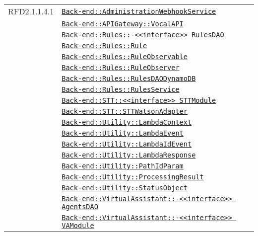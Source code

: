 \begin{longtable}{|>{\centering}m{3cm}|m{10cm}<{\centering}|}
RFD2.1.1.4.1 & \hyperref[Back-end::AdministrationWebhookService]{\texttt{Back-end::AdministrationWebhookService}}\\
& \hyperref[Back-end::APIGateway::VocalAPI]{\texttt{Back-end::APIGateway::VocalAPI}}\\
& \hyperref[Back-end::Rules::<<interface>> RulesDAO]{\texttt{Back-end::Rules::-\linebreak <<interface>> RulesDAO}}\\
& \hyperref[Back-end::Rules::Rule]{\texttt{Back-end::Rules::Rule}}\\
& \hyperref[Back-end::Rules::RuleObservable]{\texttt{Back-end::Rules::RuleObservable}}\\
& \hyperref[Back-end::Rules::RuleObserver]{\texttt{Back-end::Rules::RuleObserver}}\\
& \hyperref[Back-end::Rules::RulesDAODynamoDB]{\texttt{Back-end::Rules::RulesDAODynamoDB}}\\
& \hyperref[Back-end::Rules::RulesService]{\texttt{Back-end::Rules::RulesService}}\\
& \hyperref[Back-end::STT::<<interface>> STTModule]{\texttt{Back-end::STT::<<interface>> STTModule}}\\
& \hyperref[Back-end::STT::STTWatsonAdapter]{\texttt{Back-end::STT::STTWatsonAdapter}}\\
& \hyperref[Back-end::Utility::LambdaContext]{\texttt{Back-end::Utility::LambdaContext}}\\
& \hyperref[Back-end::Utility::LambdaEvent]{\texttt{Back-end::Utility::LambdaEvent}}\\
& \hyperref[Back-end::Utility::LambdaIdEvent]{\texttt{Back-end::Utility::LambdaIdEvent}}\\
& \hyperref[Back-end::Utility::LambdaResponse]{\texttt{Back-end::Utility::LambdaResponse}}\\
& \hyperref[Back-end::Utility::PathIdParam]{\texttt{Back-end::Utility::PathIdParam}}\\
& \hyperref[Back-end::Utility::ProcessingResult]{\texttt{Back-end::Utility::ProcessingResult}}\\
& \hyperref[Back-end::Utility::StatusObject]{\texttt{Back-end::Utility::StatusObject}}\\
& \hyperref[Back-end::VirtualAssistant::<<interface>> AgentsDAO]{\texttt{Back-end::VirtualAssistant::-\linebreak <<interface>> AgentsDAO}}\\
& \hyperref[Back-end::VirtualAssistant::<<interface>> VAModule]{\texttt{Back-end::VirtualAssistant::-\linebreak <<interface>> VAModule}}\\

\end{longtable}
